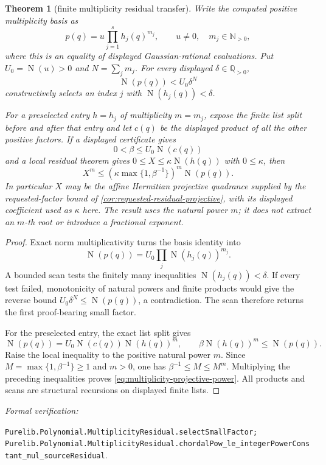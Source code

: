 \documentclass[11pt]{article}
\newtheorem{theorem}{Theorem}[section]
\newcommand{\Q}{\mathbb{Q}}
\newcommand{\N}{\mathbb{N}}
\newcommand{\Norm}[1]{\operatorname{N}\!\left(#1\right)}
\newcommand{\leanref}[1]{\par\smallskip\noindent
  \emph{Formal verification:}\par\nobreak
  {\raggedright\nolinkurl{#1}.\par}}
\begin{document}
\begin{theorem}[finite multiplicity residual transfer]
\label{thm:multiplicity-residual}
Write the computed positive multiplicity basis as
\[
             p(q)=u\prod_{j=1}^{s}h_j(q)^{m_j},
 \qquad u\ne0,\quad m_j\in\N_{>0},
\]
where this is an equality of displayed Gaussian-rational evaluations.  Put
$U_0=\Norm u>0$ and $N=\sum_jm_j$.  For every displayed
$\delta\in\Q_{>0}$,
\[
             \Norm{p(q)}<U_0\delta^N
\]
constructively selects an index $j$ with
$\Norm{h_j(q)}<\delta$.

For a preselected entry $h=h_j$ of multiplicity $m=m_j$, expose the finite
list split before and after that entry and let $c(q)$ be the displayed product
of all the other positive factors.  If a displayed certificate gives
\[
       0<\beta\le U_0\Norm{c(q)}
\]
and a local residual theorem gives
$0\le X\le\kappa\Norm{h(q)}$ with $0\le\kappa$, then
\begin{equation}
\label{eq:multiplicity-projective-power}
 X^m\le
 \left(\kappa\max\{1,\beta^{-1}\}\right)^m\Norm{p(q)}.
\end{equation}
In particular $X$ may be the affine Hermitian projective quadrance supplied
by the requested-factor bound of
\cref{cor:requested-residual-projective}, with its
displayed coefficient used as $\kappa$ here.  The result uses the natural power $m$;
it does not extract an $m$-th root or introduce a fractional exponent.
\end{theorem}

\begin{proof}
Exact norm multiplicativity turns the basis identity into
\[
 \Norm{p(q)}=U_0\prod_j\Norm{h_j(q)}^{m_j}.
\]
A bounded scan tests the finitely many inequalities
$\Norm{h_j(q)}<\delta$.  If every test failed, monotonicity of natural powers
and finite products would give the reverse bound
$U_0\delta^N\le\Norm{p(q)}$, a contradiction.  The scan therefore returns
the first proof-bearing small factor.

For the preselected entry, the exact list split gives
\[
 \Norm{p(q)}=U_0\Norm{c(q)}\Norm{h(q)}^m,
 \qquad
 \beta\Norm{h(q)}^m\le\Norm{p(q)}.
\]
Raise the local inequality to the positive natural power $m$.  Since
$M=\max\{1,\beta^{-1}\}\ge1$ and $m>0$, one has
$\beta^{-1}\le M\le M^m$.  Multiplying the preceding inequalities proves
\eqref{eq:multiplicity-projective-power}.  All products and scans are structural
recursions on displayed finite lists.
\end{proof}

\leanref{Purelib.Polynomial.MultiplicityResidual.selectSmallFactor;
Purelib.Polynomial.MultiplicityResidual.chordalPow_le_integerPowerConstant_mul_sourceResidual}
\end{document}
